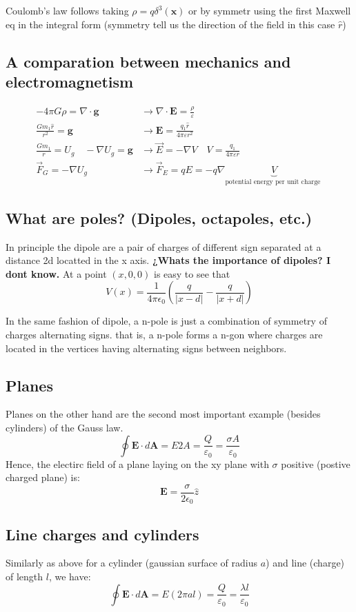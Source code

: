 Coulomb's law follows taking $\rho =q \delta^3(\mathbf{x})$ or by symmetr using the first Maxwell eq in the integral form (symmetry tell us the direction of the field in this case $\hat{r}$)

\subsection{A comparation between mechanics and electromagnetism}
$$\begin{align*}
    -4 \pi G \rho =\nabla \cdot \mathbf{g}&\rightarrow \nabla \cdot \mathbf{E} = \frac{\rho}{\varepsilon}\\
    \frac{G m_1\hat{r}}{r^2}= \mathbf{g} &\rightarrow\mathbf{E}=\frac{q_1 \hat{r}}{4\pi \varepsilon r^2}\\
    \frac{G m_1}{r}=U_g \quad -\nabla U_g =\mathbf{g}  &\rightarrow \vec{E}=-\nabla V \quad  V=\frac{q_1 }{4\pi \varepsilon r}\\
    \vec{F}_G = -\nabla U_g & \rightarrow \vec{F}_E =qE=-q\nabla\underbrace{ V}_{
       \text{
          potential energy per unit charge 
       } 
    }
\end{align*}$$



\subsection{What are poles? (Dipoles, octapoles, etc.)}
In principle the dipole are a pair of charges of different sign separated at a distance 2d locatted in the x axis. {\bf ¿Whats the importance of dipoles? I dont know.} At a point $(x,0,0)$ is easy to see that $$V(x)=\frac{1}{4 \pi \epsilon_{0}}\left(\frac{q}{|x-d|}-\frac{q}{|x+d|}\right)$$ 

In the same fashion of dipole, a n-pole is just a combination of symmetry of charges alternating signs. that is, a n-pole forms a n-gon where charges are located in the vertices having alternating signs between neighbors.
\subsection{Planes}
Planes on the other hand are the second most important example (besides cylinders) of the Gauss law. 
$$\oint \mathbf{E}\cdot d\mathbf{A}=E2A=\frac{Q}{\varepsilon_0}=\frac{\sigma A}{\varepsilon_0}$$
Hence, the electirc field of a plane  laying on the xy plane with $\sigma$ positive (postive charged plane) is:
$$\boxed{\mathbf{E}=\frac{\sigma}{2 \epsilon_{0}} \hat{z}}$$
\subsection{Line charges and cylinders}
Similarly as above for a cylinder (gaussian surface of radius $a$) and line (charge) of length $l$, we have: $$\oint \mathbf{E} \cdot d\mathbf{A}=E(2\pi a l)=\frac{Q}{\varepsilon_0}=\frac{\lambda l}{\varepsilon_0}$$

